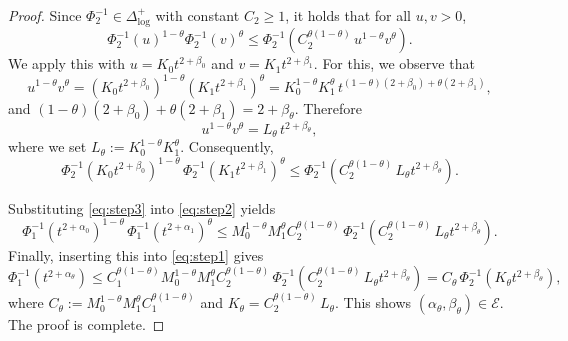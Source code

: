 \documentclass[10pt,a4paper]{amsart}
\begin{document}
\begin{proof}
Since $\Phi_2^{-1}\in\Delta_{\log}^+$ with constant $C_2\ge 1$, it holds that for all $u,v>0$,
\[
\Phi_2^{-1}(u)^{1-\theta}\Phi_2^{-1}(v)^{\theta}
\le 
\Phi_2^{-1}\!\left(C_2^{\theta(1-\theta)}\,u^{1-\theta}v^{\theta}\right).
\]
We apply this with $u = K_0 t^{2+\beta_0}$ and $v = K_1 t^{2+\beta_1}$. For this, we observe that
\[
u^{1-\theta}v^{\theta}
= (K_0 t^{2+\beta_0})^{1-\theta} (K_1 t^{2+\beta_1})^{\theta}
= K_0^{1-\theta}K_1^{\theta} \,
t^{(1-\theta)(2+\beta_0)+\theta(2+\beta_1)},
\]
and $(1-\theta)(2+\beta_0)+\theta(2+\beta_1) = 2+\beta_\theta$. Therefore
\[
u^{1-\theta}v^{\theta} = L_\theta \, t^{2+\beta_\theta},
\]
where we set $L_\theta := K_0^{1-\theta}K_1^{\theta}$. Consequently,
\begin{equation}\label{eq:step3}
\Phi_2^{-1}(K_0 t^{2+\beta_0})^{1-\theta}\,
\Phi_2^{-1}(K_1 t^{2+\beta_1})^{\theta}
\le 
\Phi_2^{-1}\!\left(C_2^{\theta(1-\theta)}\,L_\theta t^{2+\beta_\theta}\right).
\end{equation}

Substituting \eqref{eq:step3} into \eqref{eq:step2} yields
\[
\Phi_1^{-1}(t^{2+\alpha_0})^{1-\theta}\,
\Phi_1^{-1}(t^{2+\alpha_1})^{\theta}
\le M_0^{1-\theta} M_1^{\theta} C_2^{\theta(1-\theta)}\,
\Phi_2^{-1}\!\left(C_2^{\theta(1-\theta)}\,L_\theta t^{2+\beta_\theta}\right).
\]
Finally, inserting this into \eqref{eq:step1} gives
\[
\Phi_1^{-1}(t^{2+\alpha_\theta})
\le C_1^{\theta(1-\theta)} M_0^{1-\theta} M_1^{\theta} C_2^{\theta(1-\theta)}\,
\Phi_2^{-1}\!\left(C_2^{\theta(1-\theta)}\,L_\theta t^{2+\beta_\theta}\right)
= C_\theta \, \Phi_2^{-1}\!\left(K_\theta t^{2+\beta_\theta}\right),
\]
where $C_\theta := M_0^{1-\theta} M_1^{\theta} C_1^{\theta(1-\theta)}$ and $K_\theta=C_2^{\theta(1-\theta)}\,L_\theta$. This shows $(\alpha_\theta,\beta_\theta) \in \mathcal{E}$. The proof is complete.
\end{proof}
\end{document}
